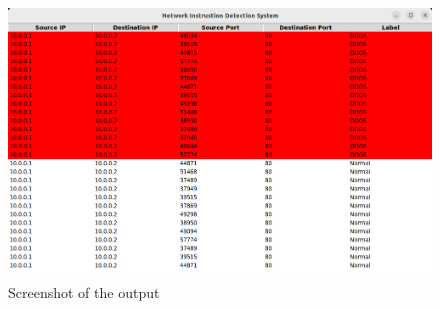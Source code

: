 \begin{figure}[tbh]
	\begin{center}
		\includegraphics[width=5in]{images/annex.png}
		\caption{Screenshot of the output}
		\label{Screenshot of the output}
	\end{center}
\end{figure}
\renewcommand\bibname{References} %


